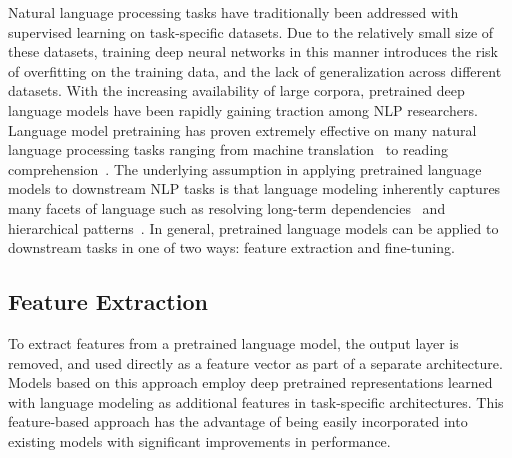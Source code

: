 Natural language processing tasks have traditionally been addressed with supervised learning on task-specific datasets.
Due to the relatively small size of these datasets, training deep neural networks in this manner introduces the risk of overfitting on the training data, and the lack of generalization across different datasets.
With the increasing availability of large corpora, pretrained deep language models have been rapidly gaining traction among NLP researchers.
Language model pretraining has proven extremely effective on many natural language processing tasks ranging from machine translation~\cite{vaswani2017attention, DBLP:journals/corr/abs-1901-07291} to reading comprehension~\cite{DBLP:journals/corr/abs-1907-11692}.
The underlying assumption in applying pretrained language models to downstream NLP tasks is that language modeling inherently captures many facets of language such as resolving long-term dependencies~\cite{DBLP:journals/corr/LinzenDG16} and hierarchical patterns~\cite{DBLP:journals/corr/abs-1803-11138}.
In general, pretrained language models can be applied to downstream tasks in one of two ways: feature extraction and fine-tuning.

\subsection{Feature Extraction}

To extract features from a pretrained language model, the output layer is removed, and used directly as a feature vector as part of a separate architecture.
Models based on this approach employ deep pretrained representations learned with language modeling as additional features in task-specific architectures.
This feature-based approach has the advantage of being easily incorporated into existing models with significant improvements in performance.

